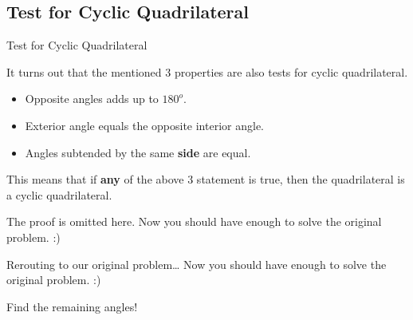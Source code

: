 \documentclass{beamer}
\begin{document}
\subsection{Test for Cyclic Quadrilateral}
\begin{frame}{Test for Cyclic Quadrilateral}
	\begin{center}
		\begin{minipage}{0.9\textwidth}
			\begin{theorem}
				It turns out that the mentioned $3$ properties are also tests for cyclic quadrilateral.
				\begin{itemize}
					\item Opposite angles adds up to $180^o$.
					\item Exterior angle equals the opposite interior angle.
					\item Angles subtended by the same \textbf{side} are equal.
				\end{itemize}
				This means that if \textbf{any} of the above $3$ statement is true, then the quadrilateral is a cyclic quadrilateral.
			\end{theorem}
			The proof is omitted here. Now you should have enough to solve the original problem. :)
		\end{minipage}
		
	\end{center}
\end{frame}

\begin{frame}{Rerouting to our original problem\ldots}
	Now you should have enough to solve the original problem. :)
	\begin{center}
	\end{center}
	Find the remaining angles!
\end{frame}
\end{document}

